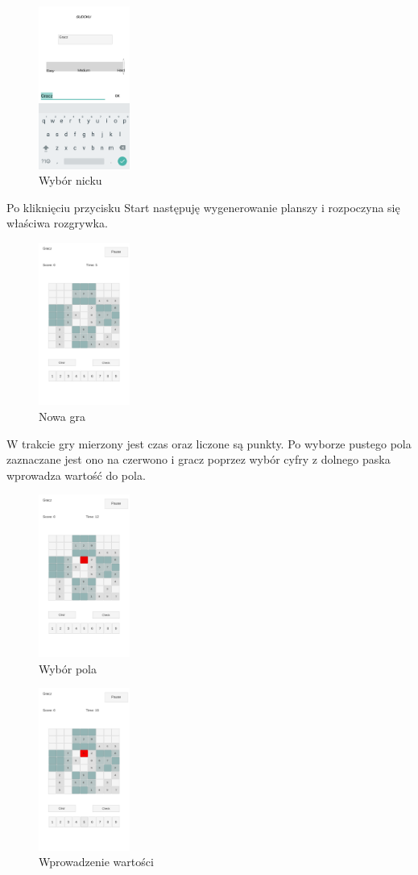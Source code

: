 \documentclass[a4paper, 11pt]{article}
\begin{document}
\begin{figure}[H]
	\centering
	\includegraphics[width=3cm]{zrzuty/3.png}
	\caption{Wybór nicku}
	\label{fig:wybor_nicku}
\end{figure}
Po kliknięciu przycisku Start następuję wygenerowanie planszy i rozpoczyna się właściwa rozgrywka.  
\begin{figure}[H]
	\centering
	\includegraphics[width=3cm]{zrzuty/4.png}
	\caption{Nowa gra}
	\label{fig:nowagra}
\end{figure}
W trakcie gry mierzony jest czas oraz liczone są punkty. Po wyborze pustego pola zaznaczane jest ono na czerwono i gracz poprzez wybór cyfry z dolnego paska wprowadza wartość do pola.
\begin{figure}[H]
	\centering
	\includegraphics[width=3cm]{zrzuty/5.png}
	\caption{Wybór pola}
	\label{fig:wybor_pola}
\end{figure}
\begin{figure}[H]
	\centering
	\includegraphics[width=3cm]{zrzuty/6.png}
	\caption{Wprowadzenie wartości}
	\label{fig:wprowadzenie_wartosci}
\end{figure}
\end{document}
